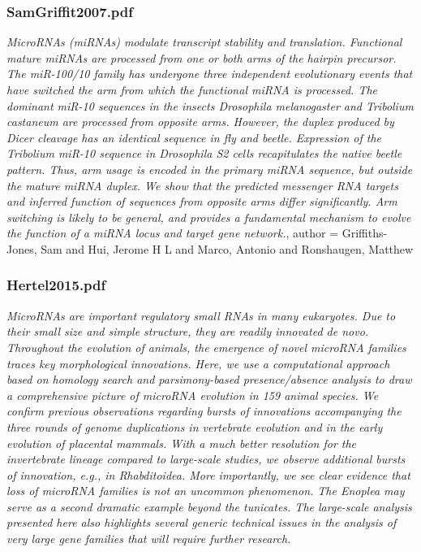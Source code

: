 \documentclass[graybox]{svmult}
\begin{document}
\subsubsection{SamGriffit2007.pdf}
\cite{Griffiths-Jones2011}
\textit{MicroRNAs (miRNAs) modulate transcript stability and translation. Functional mature miRNAs are processed from one or both arms of the hairpin precursor. The miR-100/10 family has undergone three independent evolutionary events that have switched the arm from which the functional miRNA is processed. The dominant miR-10 sequences in the insects Drosophila melanogaster and Tribolium castaneum are processed from opposite arms. However, the duplex produced by Dicer cleavage has an identical sequence in fly and beetle. Expression of the Tribolium miR-10 sequence in Drosophila S2 cells recapitulates the native beetle pattern. Thus, arm usage is encoded in the primary miRNA sequence, but outside the mature miRNA duplex. We show that the predicted messenger RNA targets and inferred function of sequences from opposite arms differ significantly. Arm switching is likely to be general, and provides a fundamental mechanism to evolve the function of a miRNA locus and target gene network.},
author = {Griffiths-Jones, Sam and Hui, Jerome H L and Marco, Antonio and Ronshaugen, Matthew}

\subsubsection{Hertel2015.pdf}
\cite{Hertel2015}
\textit{MicroRNAs are important regulatory small RNAs in many eukaryotes. Due to their small size and simple structure, they are readily innovated de novo. Throughout the evolution of animals, the emergence of novel microRNA families traces key morphological innovations. Here, we use a computational approach based on homology search and parsimony-based presence/absence analysis to draw a comprehensive picture of microRNA evolution in 159 animal species. We confirm previous observations regarding bursts of innovations accompanying the three rounds of genome duplications in vertebrate evolution and in the early evolution of placental mammals. With a much better resolution for the invertebrate lineage compared to large-scale studies, we observe additional bursts of innovation, e.g., in Rhabditoidea. More importantly, we see clear evidence that loss of microRNA families is not an uncommon phenomenon. The Enoplea may serve as a second dramatic example beyond the tunicates. The large-scale analysis presented here also highlights several generic technical issues in the analysis of very large gene families that will require further research.}
\end{document}
